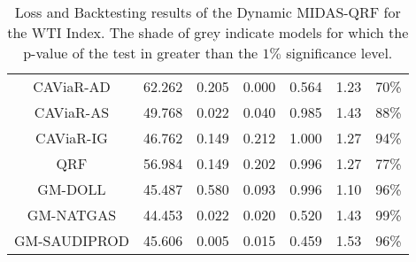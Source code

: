 \begin{table}[H]
\begin{tabular}{ccccccc}
CAViaR-AD                     & 62.262 & 0.205    & 0.000    & 0.564    & 1.23 & 70\%   \\
CAViaR-AS                     & 49.768 & 0.022    & 0.040    & 0.985    & 1.43 & 88\%   \\
\rowcolor[HTML]{D9D9D9} 
CAViaR-IG                     & 46.762 & 0.149    & 0.212    & 1.000    & 1.27 & 94\%   \\
\rowcolor[HTML]{D9D9D9} 
QRF                           & 56.984 & 0.149    & 0.202    & 0.996    & 1.27 & 77\%   \\
\rowcolor[HTML]{D9D9D9} 
GM-DOLL                       & 45.487 & 0.580    & 0.093    & 0.996    & 1.10 & 96\%   \\
\rowcolor[HTML]{D9D9D9} GM-NATGAS                     & 44.453 & 0.022    & 0.020    & 0.520    & 1.43 & 99\%   \\
GM-SAUDIPROD                 & 45.606 & 0.005    & 0.015    & 0.459    & 1.53 & 96\%   \\ \hline
\end{tabular}
\caption{Loss and Backtesting results of the Dynamic MIDAS-QRF for the WTI Index.  The shade of grey indicate models for which the p-value of the test in greater than the $1\%$ significance level.}
\label{tab:wti-dyn}
\end{table}